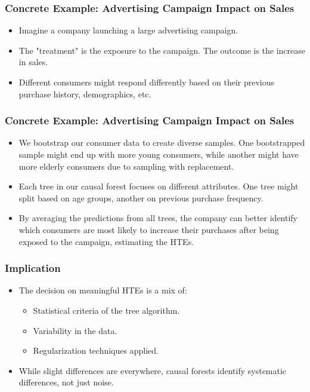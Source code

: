 \documentclass{beamer}
\begin{document}
\begin{frame}
\frametitle{Concrete Example: Advertising Campaign Impact on Sales}
\begin{itemize}
\item Imagine a company launching a large advertising campaign. 
\item The "treatment" is the exposure to the campaign. The outcome is the increase in sales.
\item Different consumers might respond differently based on their previous purchase history, demographics, etc.
\end{itemize}
\end{frame}

\begin{frame}
\frametitle{Concrete Example: Advertising Campaign Impact on Sales}
\begin{itemize}
\item We bootstrap our consumer data to create diverse samples. One bootstrapped sample might end up with more young consumers, while another might have more elderly consumers due to sampling with replacement.
\item Each tree in our causal forest focuses on different attributes. One tree might split based on age groups, another on previous purchase frequency.
\item By averaging the predictions from all trees, the company can better identify which consumers are most likely to increase their purchases after being exposed to the campaign, estimating the HTEs.
\end{itemize}
\end{frame}


\begin{frame}
\frametitle{Implication}
\begin{itemize}
\item The decision on meaningful HTEs is a mix of:
\begin{itemize}
\item Statistical criteria of the tree algorithm.
\item Variability in the data.
\item Regularization techniques applied.
\end{itemize}
\item While slight differences are everywhere, causal forests identify systematic differences, not just noise.
\end{itemize}
\end{frame}
\end{document}
